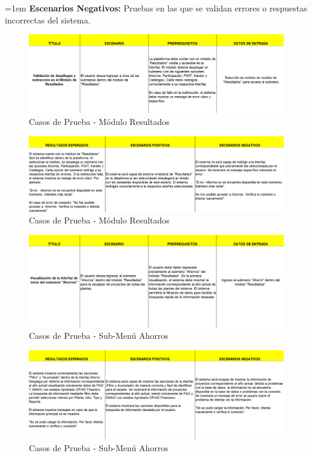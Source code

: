 \documentclass[12pt,letterpaper,spanish, xcolor=table]{report}
\numberwithin{figure}{subsection}
\begin{document}
	{\leftskip=1em 
		\noindent 
		\textbf{Escenarios Negativos:} Pruebas en las que se validan errores o respuestas incorrectas del sistema.
	\par}
	\newpage
	
	\begin{figure}[H]
		\centering
		\includegraphics[width=1.0\textwidth]
		{Imagenes/CenterPoint/CPResultados.png}
		\caption{Casos de Prueba - Módulo Resultados}\label{a2}
	\end{figure}
	
	\begin{figure}[H]
		\centering
		\includegraphics[width=1.0\textwidth]
		{Imagenes/CenterPoint/CPResultados2.png}
		\caption{Casos de Prueba - Módulo Resultados}\label{a2}
	\end{figure}
	
	\begin{figure}[H]
		\centering
		\includegraphics[width=1.0\textwidth]
		{Imagenes/CenterPoint/CPAhorros.png}
		\caption{Casos de Prueba - Sub-Menú Ahorros}\label{a2}
	\end{figure}
	
	\begin{figure}[H]
		\centering
		\includegraphics[width=1.0\textwidth]
		{Imagenes/CenterPoint/CPAhorros2.png}
		\caption{Casos de Prueba - Sub-Menú Ahorros}\label{a3}
	\end{figure}
	
\end{document}

